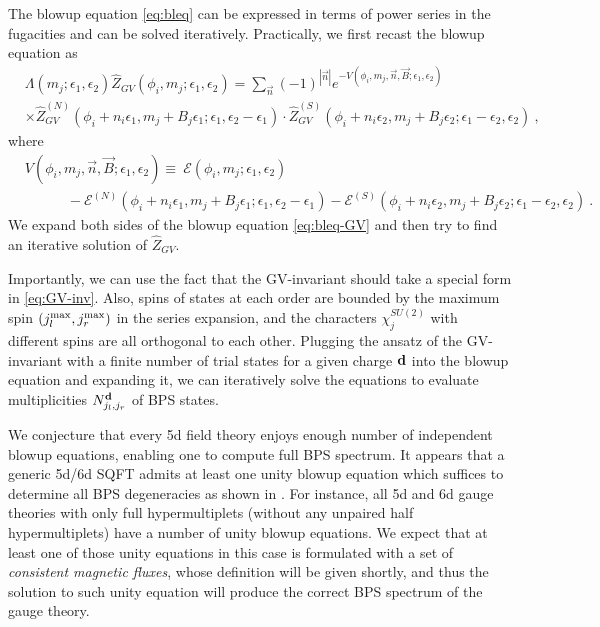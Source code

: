The blowup equation \eqref{eq:bleq} can be expressed in terms of power series in the fugacities and can be solved iteratively. Practically, we first recast the blowup equation as
\begin{align}\label{eq:bleq-GV}
	&\Lambda(m_j;\epsilon_{1},\epsilon_2) \hat{Z}_{GV}(\phi_i,m_j;\epsilon_1,\epsilon_2) = \sum_{\vec{n}}(-1)^{|\vec{n}|}e^{-V(\phi_i,m_j,\vec{n},\vec{B};\epsilon_1,\epsilon_2) } \nonumber \\
	&\times \hat{Z}_{GV}^{(N)} (\phi_i\!+\!n_i\epsilon_1,m_j\!+\!B_j\epsilon_1;\epsilon_1,\epsilon_2\!-\!\epsilon_1) \cdot \hat{Z}_{GV}^{(S)}(\phi_i\!+\!n_i\epsilon_2,m_j\!+\!B_j\epsilon_2;\epsilon_1\!-\!\epsilon_2,\epsilon_2) \ ,
\end{align}
where 
\begin{align}\label{eq:GV-V}
	&V(\phi_i,m_j,\vec{n},\vec{B};\epsilon_1,\epsilon_2) \equiv \  \mathcal{E}(\phi_i,m_j;\epsilon_1,\epsilon_2) \\
	& \qquad \quad - \mathcal{E}^{(N)}(\phi_i\!+\!n_i\epsilon_1,m_j\!+\!B_j\epsilon_1;\epsilon_1,\epsilon_2-\epsilon_1) - \mathcal{E}^{(S)}(\phi_i\!+\!n_i\epsilon_2,m_j\!+\!B_j\epsilon_2;\epsilon_1-\epsilon_2,\epsilon_2)\nonumber \ .
\end{align}
We expand both sides of the blowup equation \eqref{eq:bleq-GV} and then try to find an iterative solution of $\hat{Z}_{GV}$.

Importantly, we can use the fact that the GV-invariant should take a special form in \eqref{eq:GV-inv}. Also, spins of states at each order are bounded by the maximum spin $(j_l^{\rm max},j_r^{\rm max})$ in the series expansion, and the characters $\chi_j^{SU(2)}$ with different spins are all orthogonal to each other. Plugging the ansatz of the GV-invariant  with a finite number of trial states for a given charge ${\bf d}$ into the blowup equation and expanding it, we can iteratively solve the equations to evaluate multiplicities $N_{j_l,j_r}^{\bf d}$ of BPS states.

We conjecture that every 5d field theory enjoys enough number of independent blowup equations, enabling one to compute full BPS spectrum. It appears that a generic 5d/6d SQFT admits at least one unity blowup equation which suffices to determine all BPS degeneracies as shown in \cite{Huang:2017mis}. For instance, all 5d and 6d gauge theories with only full hypermultiplets (without any unpaired half hypermultiplets) have a number of unity blowup equations. We expect that at least one of those unity equations in this case is formulated with a set of {\it consistent magnetic fluxes}, whose definition will be given shortly, and thus the solution to such unity equation will produce the correct BPS spectrum of the gauge theory.

